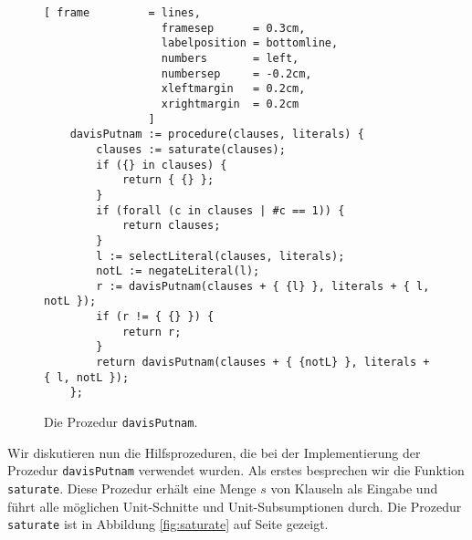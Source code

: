 \begin{figure}[!ht]
  \centering
\begin{Verbatim}[ frame         = lines, 
                  framesep      = 0.3cm, 
                  labelposition = bottomline,
                  numbers       = left,
                  numbersep     = -0.2cm,
                  xleftmargin   = 0.2cm,
                  xrightmargin  = 0.2cm
                ]
    davisPutnam := procedure(clauses, literals) {
        clauses := saturate(clauses);
        if ({} in clauses) {
            return { {} };
        }
        if (forall (c in clauses | #c == 1)) {
            return clauses;
        }
        l := selectLiteral(clauses, literals);
        notL := negateLiteral(l);    
        r := davisPutnam(clauses + { {l} }, literals + { l, notL });
        if (r != { {} }) {
            return r;
        }     
        return davisPutnam(clauses + { {notL} }, literals + { l, notL });
    };
\end{Verbatim}
\vspace*{-0.3cm}
  \caption{Die Prozedur \texttt{davisPutnam}.}
  \label{fig:davisPutnam}
\end{figure} 

Wir diskutieren nun die Hilfsprozeduren, die bei der Implementierung der Prozedur
\texttt{davisPutnam} verwendet wurden.
Als erstes besprechen wir die Funktion \texttt{saturate}.  Diese Prozedur erh\"{a}lt eine
Menge $s$ von Klauseln als Eingabe und f\"{u}hrt alle m\"{o}glichen Unit-Schnitte und
Unit-Subsumptionen durch.  
Die Prozedur \texttt{saturate} ist in Abbildung \ref{fig:saturate} auf Seite \pageref{fig:saturate}
gezeigt.

